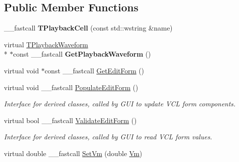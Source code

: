 \subsection*{Public Member Functions}
\begin{DoxyCompactItemize}
\item 
\hypertarget{class_t_playback_cell_ac6cc9092b073fa782d455da1bbb14916}{\+\_\+\+\_\+fastcall {\bfseries T\+Playback\+Cell} (const std\+::wstring \&name)}\label{class_t_playback_cell_ac6cc9092b073fa782d455da1bbb14916}

\item 
\hypertarget{class_t_playback_cell_ac48549662a7ca95cbd35b2f9b3abe250}{virtual \hyperlink{class_t_playback_waveform}{T\+Playback\+Waveform} \\*
$\ast$const \+\_\+\+\_\+fastcall {\bfseries Get\+Playback\+Waveform} ()}\label{class_t_playback_cell_ac48549662a7ca95cbd35b2f9b3abe250}

\item 
virtual void $\ast$const \+\_\+\+\_\+fastcall \hyperlink{class_t_playback_cell_a5cd1500e6e80753779d7dee74f4b84d2}{Get\+Edit\+Form} ()
\item 
\hypertarget{class_t_playback_cell_a755c17c4499e465d02952e59689b5196}{virtual void \+\_\+\+\_\+fastcall \hyperlink{class_t_playback_cell_a755c17c4499e465d02952e59689b5196}{Populate\+Edit\+Form} ()}\label{class_t_playback_cell_a755c17c4499e465d02952e59689b5196}

\begin{DoxyCompactList}\small\item\em Interface for derived classes, called by G\+U\+I to update V\+C\+L form components. \end{DoxyCompactList}\item 
\hypertarget{class_t_playback_cell_abaae8a711796f5a8aa3498aefbd30c8c}{virtual bool \+\_\+\+\_\+fastcall \hyperlink{class_t_playback_cell_abaae8a711796f5a8aa3498aefbd30c8c}{Validate\+Edit\+Form} ()}\label{class_t_playback_cell_abaae8a711796f5a8aa3498aefbd30c8c}

\begin{DoxyCompactList}\small\item\em Interface for derived classes, called by G\+U\+I to read V\+C\+L form values. \end{DoxyCompactList}\item 
\hypertarget{class_t_playback_cell_a0794ca1e720afeb431a91c850b976003}{virtual double \+\_\+\+\_\+fastcall \hyperlink{class_t_playback_cell_a0794ca1e720afeb431a91c850b976003}{Set\+Vm} (double \hyperlink{class_t_cell_afd81f2fd923ffbfa5ea7eda2c50693d1}{Vm})}\label{class_t_playback_cell_a0794ca1e720afeb431a91c850b976003}


\end{DoxyCompactItemize}
